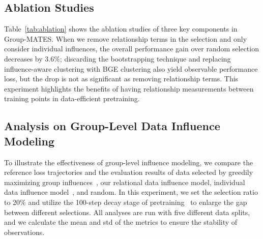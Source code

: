 \subsection{Ablation Studies}
\label{sec:ablation}


Table~\ref{tab:ablation} shows the ablation studies of three key components in Group-MATES. When we remove relationship terms in the selection and only consider individual influences, the overall performance gain over random selection decreases by 3.6\%;  discarding the bootstrapping technique and replacing influence-aware clustering with BGE clustering also yield observable performance loss, but the drop is not as significant as removing relationship terms. This experiment highlights the benefits of having relationship measurements between training points in data-efficient pretraining.

\subsection{Analysis on Group-Level Data Influence Modeling}
\label{sec:eff-modeling}


To illustrate the effectiveness of group-level influence modeling, we compare the reference loss trajectories and the evaluation results of data selected by greedily maximizing group influences~\cite{broderick2020automatic}, our relational data influence model, individual data influence model~\cite{yu2024mates}, and random.
In this experiment, we set the selection ratio to 20\% and utilize the 100-step decay stage of pretraining~\cite{hu2024minicpm} to enlarge the gap between different selections. All analyses are run with five different data splits, and we calculate the mean and std of the metrics to ensure the stability of observations. 

